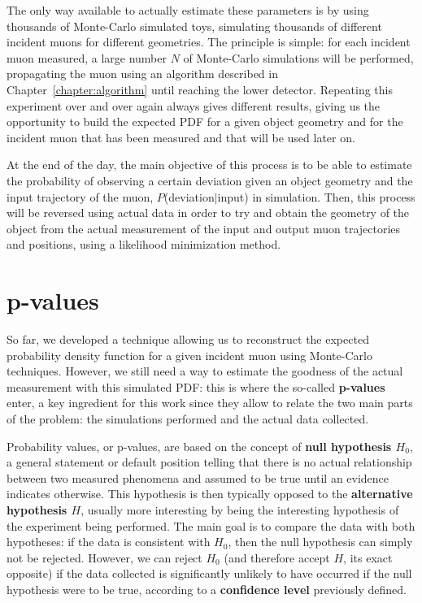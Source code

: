 \documentclass[a4paper, 11pt]{report}
\begin{document}
The only way available to actually estimate these parameters is by using thousands of Monte-Carlo simulated toys, simulating thousands of different incident muons for different geometries. The principle is simple: for each incident muon measured, a large number $N$ of Monte-Carlo simulations will be performed, propagating the muon using an algorithm described in Chapter~\ref{chapter:algorithm} until reaching the lower detector. Repeating this experiment over and over again always gives different results, giving us the opportunity to build the expected PDF for a given object geometry and for the incident muon that has been measured and that will be used later on.

At the end of the day, the main objective of this process is to be able to estimate the probability of observing a certain deviation given an object geometry and the input trajectory of the muon, $P$(deviation$|$input) in simulation. Then, this process will be reversed using actual data in order to try and obtain the geometry of the object from the actual measurement of the input and output muon trajectories and positions, using a likelihood minimization method.

\section{p-values} \label{sec:pValues}

So far, we developed a technique allowing us to reconstruct the expected probability density function for a given incident muon using Monte-Carlo techniques. However, we still need a way to estimate the goodness of the actual measurement with this simulated PDF: this is where the so-called \textbf{p-values} enter, a key ingredient for this work since they allow to relate the two main parts of the problem: the simulations performed and the actual data collected.

Probability values, or p-values, are based on the concept of \textbf{null hypothesis $H_0$}, a general statement or default position telling that there is no actual relationship between two measured phenomena and assumed to be true until an evidence indicates otherwise. This hypothesis is then typically opposed to the \textbf{alternative hypothesis $H$}, usually more interesting by being the interesting hypothesis of the experiment being performed. The main goal is to compare the data with both hypotheses: if the data is consistent with $H_0$, then the null hypothesis can simply not be rejected. However, we can reject $H_0$ (and therefore accept $H$, its exact opposite) if the data collected is significantly unlikely to have occurred if the null hypothesis were to be true, according to a \textbf{confidence level} previously defined.
\end{document}
